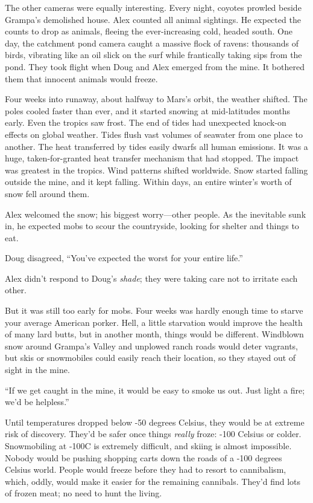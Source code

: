 The other cameras were equally interesting. Every night, coyotes prowled
beside Grampa's demolished house. Alex counted all animal sightings. He
expected the counts to drop as animals, fleeing the ever-increasing
cold, headed south. One day, the catchment pond camera caught a massive
flock of ravens: thousands of birds, vibrating like an oil slick on the
surf while frantically taking sips from the pond. They took flight when
Doug and Alex emerged from the mine. It bothered them that innocent
animals would freeze.

Four weeks into runaway, about halfway to Mars's orbit, the weather
shifted. The poles cooled faster than ever, and it started snowing at
mid-latitudes months early. Even the tropics saw frost. The end of tides
had unexpected knock-on effects on global weather. Tides flush vast
volumes of seawater from one place to another. The heat transferred by
tides easily dwarfs all human emissions. It was a huge,
taken-for-granted heat transfer mechanism that had stopped. The impact
was greatest in the tropics. Wind patterns shifted worldwide. Snow
started falling outside the mine, and it kept falling. Within days, an
entire winter's worth of snow fell around them.

Alex welcomed the snow; his biggest worry---other people. As the
inevitable sunk in, he expected mobs to scour the countryside, looking
for shelter and things to eat.

Doug disagreed, ``You've expected the worst for your entire life.''

Alex didn't respond to Doug's \emph{shade}; they were taking care not to
irritate each other.

But it was still too early for mobs. Four weeks was hardly enough time
to starve your average American porker. Hell, a little starvation would
improve the health of many lard butts, but in another month, things
would be different. Windblown snow around Grampa's Valley and unplowed
ranch roads would deter vagrants, but skis or snowmobiles could easily
reach their location, so they stayed out of sight in the mine.

``If we get caught in the mine, it would be easy to smoke us out. Just
light a fire; we'd be helpless.''

Until temperatures dropped below -50 degrees Celsius, they would be at
extreme risk of discovery. They'd be safer once things \emph{really}
froze: -100 Celsius or colder. Snowmobiling at -100C is extremely
difficult, and skiing is almost impossible. Nobody would be pushing
shopping carts down the roads of a -100 degrees Celsius world. People
would freeze before they had to resort to cannibalism, which, oddly,
would make it easier for the remaining cannibals. They'd find lots of
frozen meat; no need to hunt the living.

